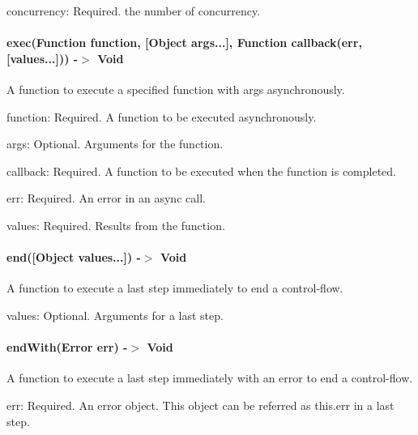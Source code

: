 \begin{DoxyItemize}
\item {\ttfamily concurrency}\+: Required. the number of concurrency.
\end{DoxyItemize}

\paragraph*{exec(Function function, \mbox{[}Object args...\mbox{]}, Function callback(err, \mbox{[}values...\mbox{]})) -\/$>$ Void}

A function to execute a specified {\ttfamily function} with {\ttfamily args} asynchronously.


\begin{DoxyItemize}
\item {\ttfamily function}\+: Required. A function to be executed asynchronously.
\item {\ttfamily args}\+: Optional. Arguments for the {\ttfamily function}.
\item {\ttfamily callback}\+: Required. A function to be executed when the {\ttfamily function} is completed.
\item {\ttfamily err}\+: Required. An error in an async call.
\item {\ttfamily values}\+: Required. Results from the {\ttfamily function}.
\end{DoxyItemize}

\paragraph*{end(\mbox{[}Object values...\mbox{]}) -\/$>$ Void}

A function to execute a last step immediately to end a control-\/flow.


\begin{DoxyItemize}
\item {\ttfamily values}\+: Optional. Arguments for a last step.
\end{DoxyItemize}

\paragraph*{end\+With(\+Error err) -\/$>$ Void}

A function to execute a last step immediately with an error to end a control-\/flow.


\begin{DoxyItemize}
\item {\ttfamily err}\+: Required. An error object. This object can be referred as {\ttfamily this.\+err} in a last step.
\end{DoxyItemize}

